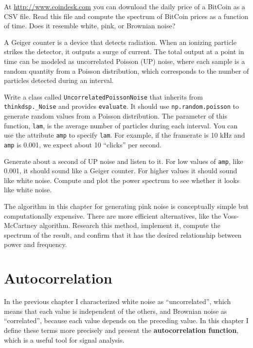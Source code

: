 \documentclass[12pt]{book} \usepackage[width=5.5in,height=8.5in, hmarginratio=3:2,vmarginratio=1:1]{geometry}
\begin{document}
\begin{exercise} At \url{http://www.coindesk.com} you can download the daily price of a BitCoin as a CSV file. Read this file and compute the spectrum of BitCoin prices as a function of time. Does it resemble white, pink, or Brownian noise? \end{exercise} 

\begin{exercise} A Geiger counter is a device that detects radiation. When an ionizing particle strikes the detector, it outputs a surge of current. The total output at a point in time can be modeled as uncorrelated Poisson (UP) noise, where each sample is a random quantity from a Poisson distribution, which corresponds to the number of particles detected during an interval. 

Write a class called {\tt UncorrelatedPoissonNoise} that inherits from \verb"thinkdsp._Noise" and provides {\tt evaluate}. It should use {\tt np.random.poisson} to generate random values from a Poisson distribution. The parameter of this function, {\tt lam}, is the average number of particles during each interval. You can use the attribute {\tt amp} to specify {\tt lam}. For example, if the framerate is 10 kHz and {\tt amp} is 0.001, we expect about 10 ``clicks'' per second. 

Generate about a second of UP noise and listen to it. For low values of {\tt amp}, like 0.001, it should sound like a Geiger counter. For higher values it should sound like white noise. Compute and plot the power spectrum to see whether it looks like white noise. \end{exercise} 

\begin{exercise} The algorithm in this chapter for generating pink noise is conceptually simple but computationally expensive. There are more efficient alternatives, like the Voss-McCartney algorithm. Research this method, implement it, compute the spectrum of the result, and confirm that it has the desired relationship between power and frequency. \end{exercise} 

\chapter{Autocorrelation} 

In the previous chapter I characterized white noise as ``uncorrelated'', which means that each value is independent of the others, and Brownian noise as ``correlated'', because each value depends on the preceding value. In this chapter I define these terms more precisely and present the {\bf autocorrelation function}, which is a useful tool for signal analysis. 
\end{document}

